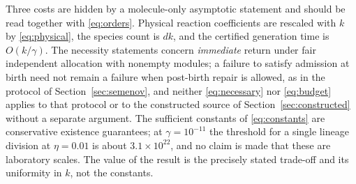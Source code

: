 Three costs are hidden by a molecule-only asymptotic statement and should be read together with \eqref{eq:orders}. Physical reaction coefficients are rescaled with $k$ by \eqref{eq:physical}, the species count is $dk$, and the certified generation time is $O(k/\gamma)$. The necessity statements concern \emph{immediate} return under fair independent allocation with nonempty modules; a failure to satisfy admission at birth need not remain a failure when post-birth repair is allowed, as in the protocol of Section~\ref{sec:semenov}, and neither \eqref{eq:necessary} nor \eqref{eq:budget} applies to that protocol or to the constructed source of Section~\ref{sec:constructed} without a separate argument. The sufficient constants of \eqref{eq:constants} are conservative existence guarantees; at $\gamma=10^{-11}$ the threshold for a single lineage division at $\eta=0.01$ is about $3.1\times10^{22}$, and no claim is made that these are laboratory scales. The value of the result is the precisely stated trade-off and its uniformity in $k$, not the constants.
